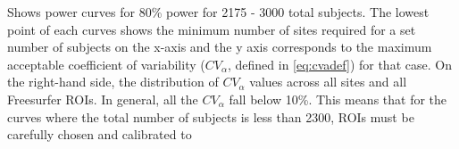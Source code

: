 \label{fig:cv_j} Shows power curves for 80\% power for 2175 - 3000 total subjects. The lowest point of each curves shows the minimum number of sites required for a set number of subjects on the x-axis and the y axis corresponds to the maximum acceptable coefficient of variability ($CV_{\alpha}$, defined in \ref{eq:cvadef}) for that case. On the right-hand side, the distribution of $CV_{\alpha}$ values across all sites and all Freesurfer ROIs. In general, all the $CV_{\alpha}$ fall below 10\%. This means that for the curves where the total number of subjects is less than 2300, ROIs must be carefully chosen and calibrated to 